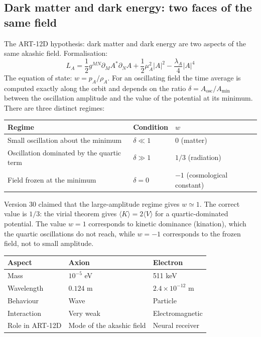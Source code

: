 \documentclass[11pt,a4paper]{article}
\begin{document}
\subsection{Dark matter and dark energy: two faces of the same field}
The ART-12D hypothesis: dark matter and dark energy are two aspects of the same akashic field. Formalisation:
\begin{equation}
L_A = \frac{1}{2} g^{MN} \partial_M A^* \partial_N A + \frac{1}{2} \mu_A^2 |A|^2 - \frac{\lambda_A}{4} |A|^4
\end{equation}
The equation of state: $w = p_A / \rho_A$. For an oscillating field the time average is computed exactly along the orbit and depends on the ratio $\delta = A_{\text{osc}}/A_{\min}$ between the oscillation amplitude and the value of the potential at its minimum. There are three distinct regimes:
\begin{center}
\begin{tabular}{@{}lll@{}}
\toprule
\textbf{Regime} & \textbf{Condition} & $w$ \\ \midrule
Small oscillation about the minimum & $\delta \ll 1$ & $0$ (matter) \\
Oscillation dominated by the quartic term & $\delta \gg 1$ & $1/3$ (radiation) \\
Field frozen at the minimum & $\delta = 0$ & $-1$ (cosmological constant) \\ \bottomrule
\end{tabular}
\end{center}
Version 30 claimed that the large-amplitude regime gives $w \simeq 1$. The correct value is $1/3$: the virial theorem gives $\langle K \rangle = 2\langle V \rangle$ for a quartic-dominated potential. The value $w = 1$ corresponds to kinetic dominance (kination), which the quartic oscillations do not reach, while $w = -1$ corresponds to the frozen field, not to small amplitude.
\begin{table}[H]
\centering
\begin{tabular}{@{}lll@{}}
\toprule
\textbf{Aspect} & \textbf{Axion} & \textbf{Electron} \\ \midrule
Mass & \(10^{-5}\) eV & 511 keV \\
Wavelength & \(0.124\) m & \(2.4\times10^{-12}\) m \\
Behaviour & Wave & Particle \\
Interaction & Very weak & Electromagnetic \\
Role in ART-12D & Mode of the akashic field & Neural receiver \\ \bottomrule
\end{tabular}
\end{table}
\end{document}
